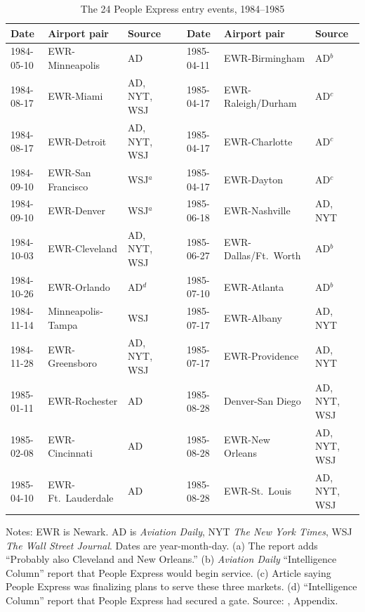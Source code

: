 \begin{table}[htbp]
\centering
\caption{The 24 People Express entry events, 1984--1985}
\label{tab:09-wc-events}
\footnotesize
\begin{tabular}{@{}llll@{\hspace{1.4em}}lll@{}}
\toprule
Date & Airport pair & Source & & Date & Airport pair & Source\\
\midrule
1984-05-10 & EWR-Minneapolis    & AD           & & 1985-04-11 & EWR-Birmingham        & AD$^{b}$\\
1984-08-17 & EWR-Miami          & AD, NYT, WSJ & & 1985-04-17 & EWR-Raleigh/Durham    & AD$^{c}$\\
1984-08-17 & EWR-Detroit        & AD, NYT, WSJ & & 1985-04-17 & EWR-Charlotte         & AD$^{c}$\\
1984-09-10 & EWR-San Francisco  & WSJ$^{a}$    & & 1985-04-17 & EWR-Dayton            & AD$^{c}$\\
1984-09-10 & EWR-Denver         & WSJ$^{a}$    & & 1985-06-18 & EWR-Nashville         & AD, NYT\\
1984-10-03 & EWR-Cleveland      & AD, NYT, WSJ & & 1985-06-27 & EWR-Dallas/Ft.\ Worth & AD$^{b}$\\
1984-10-26 & EWR-Orlando        & AD$^{d}$     & & 1985-07-10 & EWR-Atlanta           & AD$^{b}$\\
1984-11-14 & Minneapolis-Tampa  & WSJ          & & 1985-07-17 & EWR-Albany            & AD, NYT\\
1984-11-28 & EWR-Greensboro     & AD, NYT, WSJ & & 1985-07-17 & EWR-Providence        & AD, NYT\\
1985-01-11 & EWR-Rochester      & AD           & & 1985-08-28 & Denver-San Diego      & AD, NYT, WSJ\\
1985-02-08 & EWR-Cincinnati     & AD           & & 1985-08-28 & EWR-New Orleans       & AD, NYT, WSJ\\
1985-04-10 & EWR-Ft.\ Lauderdale & AD          & & 1985-08-28 & EWR-St.\ Louis        & AD, NYT, WSJ\\
\bottomrule
\end{tabular}

\smallskip
\parbox{0.97\linewidth}{\footnotesize Notes: EWR is Newark. AD is \emph{Aviation Daily}, NYT
\emph{The New York Times}, WSJ \emph{The Wall Street Journal}. Dates are year-month-day.
(a) The report adds ``Probably also Cleveland and New Orleans.'' (b) \emph{Aviation Daily}
``Intelligence Column'' report that People Express would begin service. (c) Article saying People
Express was finalizing plans to serve these three markets. (d) ``Intelligence Column'' report that
People Express had secured a gate. Source: \citet{WhinstonCollins1992}, Appendix.}
\end{table}

